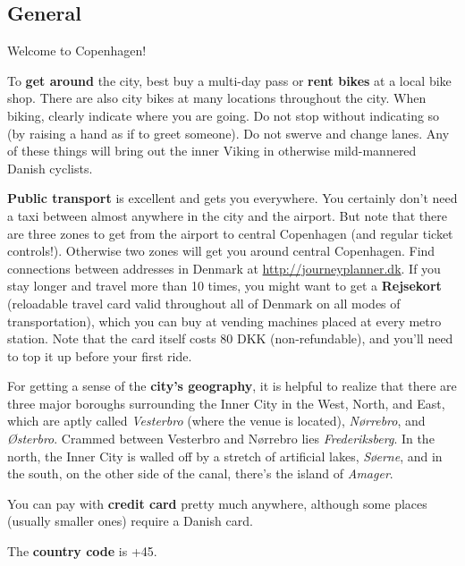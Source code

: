 \begin{left}







\section{General}
Welcome to Copenhagen!

To \textbf{get around} the city, best buy a multi-day pass or \textbf{rent bikes} at a local bike shop. There are also city bikes at many locations throughout the city. When biking, clearly indicate where you are going. Do not stop without indicating so (by raising a hand as if to greet someone). Do not swerve and change lanes. Any of these things will bring out the inner Viking in otherwise mild-mannered Danish cyclists.

\textbf{Public transport} is excellent and gets you everywhere. You certainly don't need a taxi between almost anywhere in the city and the airport. But note that there are three zones to get from the airport to central Copenhagen (and regular ticket controls!). Otherwise two zones will get you around central Copenhagen. Find connections between addresses in Denmark at \url{http://journeyplanner.dk}. If you stay longer and travel more than 10 times, you might want to get a \textbf{Rejsekort} (reloadable travel card valid throughout all of Denmark on all modes of transportation), which you can buy at vending machines placed at every metro station. Note that the card itself costs 80 DKK (non-refundable), and you’ll need to top it up before your first ride.
\par
For getting a sense of the \textbf{city’s geography}, it is helpful to realize that there are three major boroughs surrounding the Inner City in the West, North, and East, which are aptly called \textit{Vesterbro} (where the venue is located), \textit{Nørrebro}, and \textit{Østerbro}. Crammed between Vesterbro and Nørrebro lies \textit{Frederiksberg}. In the north, the Inner City is walled off by a stretch of artificial lakes, \textit{Søerne}, and in the south, on the other side of the canal, there’s the island of \textit{Amager}. 
\par
You can pay with \textbf{credit card} pretty much anywhere, although some places (usually smaller ones) require a Danish card.
\par
The \textbf{country code} is +45.



\end{left}
